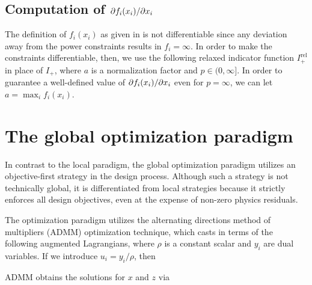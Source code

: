 \subsection{Computation of $\partial f_i(x_i) / \partial x_i$}
The definition of $f_i(x_i)$ as given in  is not differentiable 
    since any deviation away from the power constraints results in $f_i = \infty$.
In order to make the constraints differentiable, then, 
    we use the following relaxed indicator function $I^\text{rel}_+$ in place of $I_+$,
    where $a$ is a normalization factor and $p \in (0, \infty]$. 
In order to guarantee a well-defined value of $\partial f_i(x_i) / \partial x_i$ even for $p = \infty$,
    we can let $a = \max_i f_i(x_i)$.



\section{The global optimization paradigm}
In contrast to the local paradigm, 
    the global optimization paradigm utilizes an objective-first strategy
    in the design process.
Although such a strategy is not technically global,
    it is differentiated from local strategies because
    it strictly enforces all design objectives,
    even at the expense of non-zero physics residuals.

The optimization paradigm utilizes 
    the alternating directions method of multipliers\cite{Boyd11} (ADMM) optimization technique, 
    which casts  in terms of the following augmented Lagrangians, 
    where $\rho$ is a constant scalar and 
    $y_i$ are dual variables. If we introduce $u_i = y_i / \rho$, then 

ADMM obtains the solutions for $x$ and $z$ via


